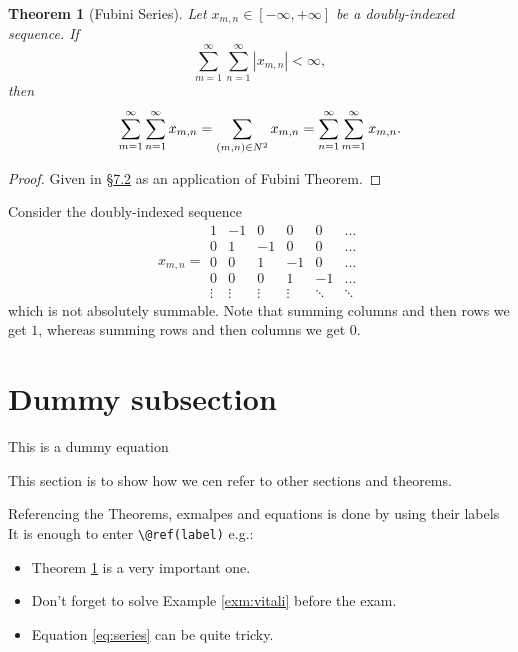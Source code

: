 \documentclass[
]{book}
\providecommand{\tightlist}{%
  \setlength{\itemsep}{0pt}\setlength{\parskip}{0pt}}
\newtheorem{theorem}[equation]{Theorem}
\theoremstyle{definition}
\theoremstyle{remark}
\newenvironment{example}{\pushQED{\qed}\renewcommand{\qedsymbol}{\scriptsize$\triangle$}\examplex}{\popQED\endexamplex}
\let\mathbb\relax %
\newcommand{\N}{\mathbb{N}}
\begin{document}
\begin{theorem}[Fubini Series]
\protect\hypertarget{thm:seriesfubini}{}\label{thm:seriesfubini}Let
\(x_{m,n} \in [-\infty,+\infty]\) be a doubly-indexed sequence. If
\[\sum_{m=1}^\infty
\sum_{n=1}^\infty
|x_{m,n}|
<\infty
,\] then \[\sum_{m=1}^\infty
\sum_{n=1}^\infty
x_{m,n}
=
\sum_{(m,n)\in\N^2} x_{m,n}
=
\sum_{n=1}^\infty
\sum_{m=1}^\infty
x_{m,n}
.\]
\end{theorem}

\begin{proof}
Given in §\protect\hyperlink{sub:fubini}{7.2} as an application of Fubini Theorem.
\end{proof}

\begin{example}
Consider the doubly-indexed sequence \[x_{m,n}=
\begin{array}{|rrrrrr}
\hline
1 & -1 & 0 & 0 & 0 & \dots
\\
0 & 1 & -1 & 0 & 0 & \dots
\\
0 & 0 & 1 & -1 & 0 & \dots
\\
0 & 0 & 0 & 1 & -1 & \dots
\\
\vdots &
\vdots &
\vdots &
\vdots &
\ddots &
\ddots
\end{array}\] which is not absolutely summable. Note that summing
columns and then rows we get \(1\), whereas summing rows and then columns
we get \(0\).
\end{example}

\hypertarget{sub:dummy}{%
\section{Dummy subsection}\label{sub:dummy}}

This is a dummy equation

This section is to show how we cen refer to other sections and theorems.

Referencing the Theorems, exmalpes and equations is done by using their labels
It is enough to enter \texttt{\textbackslash{}@ref(label)} e.g.:

\begin{itemize}
\tightlist
\item
  Theorem \ref{thm:seriesfubini} is a very important one.
\item
  Don't forget to solve Example \ref{exm:vitali} before the exam.
\item
  Equation \eqref{eq:series} can be quite tricky.
\end{itemize}
\end{document}
